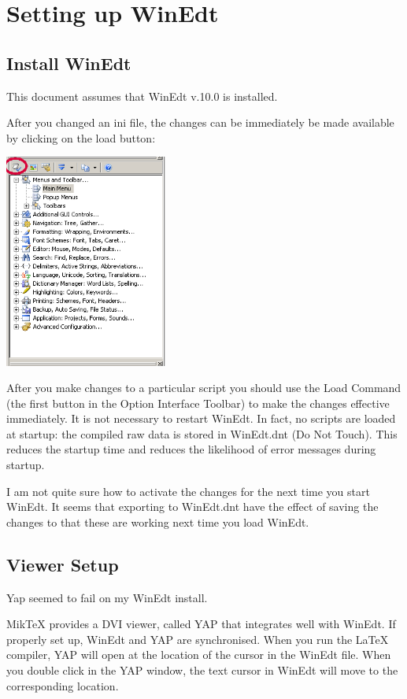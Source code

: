 
\chapter{Setting up WinEdt}

\section{Install WinEdt}
\label{sec:installwinedt}
This document assumes that WinEdt v.10.0 is installed.

After you changed an ini file, the changes can be immediately be made available by clicking on the load button:

\centerline{\includegraphics[bb= 0 0 295 388, width=0.4\textwidth]{eps/loadini.png}}

After you make changes to a particular script you should use the Load Command (the first button in the Option Interface Toolbar) to make the changes effective immediately. It is not necessary to restart WinEdt. In fact, no scripts are loaded at startup: the compiled raw data is stored in WinEdt.dnt (Do Not Touch). This reduces the startup time and reduces the likelihood of error messages during startup.


I am not quite sure how to activate the changes for the next time you start WinEdt.  It seems that exporting to WinEdt.dnt have the effect of saving the changes to that these are working next time you load WinEdt.


\section{Viewer Setup}

Yap seemed to fail on my WinEdt install.

MikTeX provides a DVI viewer, called YAP that integrates well with WinEdt. If properly set up, WinEdt and YAP are synchronised. When you run the \LaTeX{} compiler, YAP will open at the location of the cursor in the WinEdt file. When you double click in the YAP window, the text cursor in WinEdt will move to the corresponding location.

